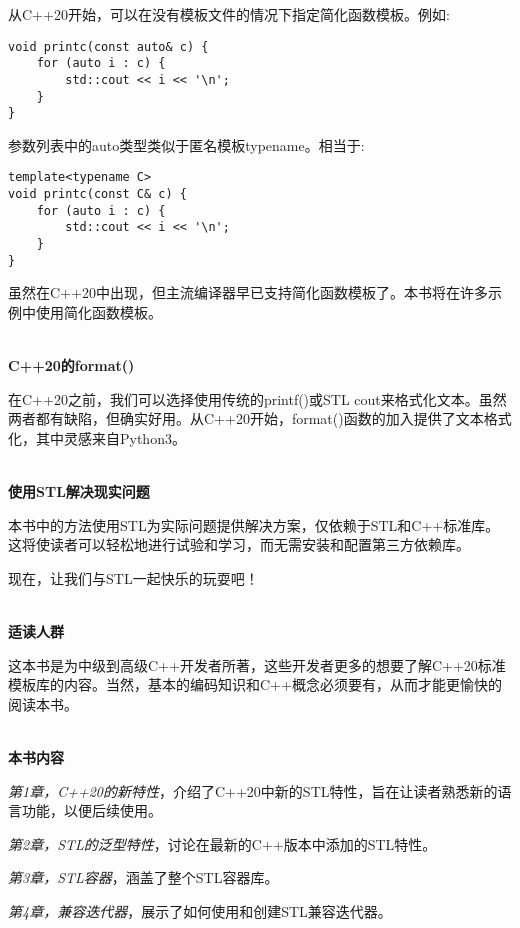 从C++20开始，可以在没有模板文件的情况下指定简化函数模板。例如:

\begin{lstlisting}[style=styleCXX]
void printc(const auto& c) {
	for (auto i : c) {
		std::cout << i << '\n';
	}
}
\end{lstlisting}

参数列表中的auto类型类似于匿名模板typename。相当于:

\begin{lstlisting}[style=styleCXX]
template<typename C>
void printc(const C& c) {
	for (auto i : c) {
		std::cout << i << '\n';
	}
}
\end{lstlisting}

虽然在C++20中出现，但主流编译器早已支持简化函数模板了。本书将在许多示例中使用简化函数模板。

\hspace*{\fill} \\ %
\noindent
\textbf{C++20的format()}

在C++20之前，我们可以选择使用传统的printf()或STL cout来格式化文本。虽然两者都有缺陷，但确实好用。从C++20开始，format()函数的加入提供了文本格式化，其中灵感来自Python3。

\hspace*{\fill} \\ %
\noindent
\textbf{使用STL解决现实问题}

本书中的方法使用STL为实际问题提供解决方案，仅依赖于STL和C++标准库。这将使读者可以轻松地进行试验和学习，而无需安装和配置第三方依赖库。

现在，让我们与STL一起快乐的玩耍吧！

\hspace*{\fill} \\ %
\noindent
\textbf{适读人群}

这本书是为中级到高级C++开发者所著，这些开发者更多的想要了解C++20标准模板库的内容。当然，基本的编码知识和C++概念必须要有，从而才能更愉快的阅读本书。

\hspace*{\fill} \\ %
\noindent
\textbf{本书内容}

\textit{第1章，C++20的新特性}，介绍了C++20中新的STL特性，旨在让读者熟悉新的语言功能，以便后续使用。

\textit{第2章，STL的泛型特性}，讨论在最新的C++版本中添加的STL特性。

\textit{第3章，STL容器}，涵盖了整个STL容器库。

\textit{第4章，兼容迭代器}，展示了如何使用和创建STL兼容迭代器。

